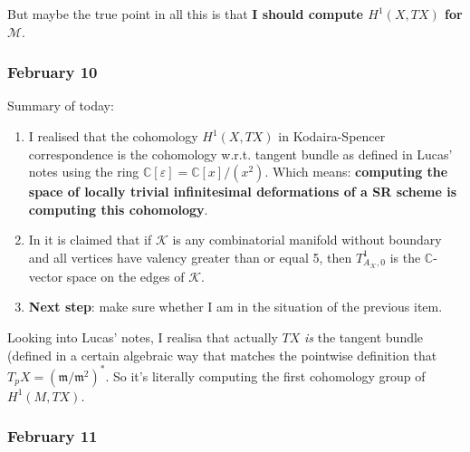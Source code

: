 But maybe the true point in all this is that \textbf{I should compute \(H^{1}(X,TX)\) for \(\mathcal{M}\)}. 
\fi

\subsubsection{February 10}
Summary of today:
\begin{enumerate}
	\item I realised that the cohomology \(H^{1}(X,TX)\) in Kodaira-Spencer correspondence is the cohomology w.r.t. tangent bundle as defined in Lucas' notes using the ring \(\mathbb{C}[\varepsilon]=\mathbb{C}[x]/(x^2)\). Which means: \textbf{computing the space of locally trivial infinitesimal deformations of a SR scheme is computing this cohomology}.
	\item In \cite{jan1} it is claimed that if \(\mathcal{K}\) is any combinatorial manifold without boundary and all vertices have valency greater than or equal 5, then \(T^1_{A_\mathcal{K},0}\) is the \(\mathbb{C}\)-vector space on the edges of \(\mathcal{K}\).
	\item  \textbf{Next step}: make sure whether I am in the situation of the previous item.
\end{enumerate}

Looking into Lucas' notes, I realisa that actually \(TX\) \textit{is} the tangent bundle (defined in a certain algebraic way that matches the pointwise definition that \(T_pX=\left(\mathfrak{m}/\mathfrak{m}^2\right) ^*\). So it's literally computing the first cohomology group  of \(H^{1}(M,TX)\).

\subsubsection{February 11}

